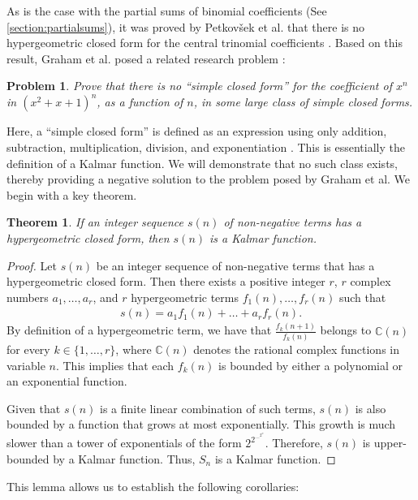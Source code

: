 \documentclass[10pt,a4paper]{article}
\theoremstyle{plain}
\newtheorem{theorem}{Theorem}[section]
\newtheorem{problem}{Problem}[section]
\begin{document}
As is the case with the partial sums of binomial coefficients (See \cref{section:partialsums}), it was proved by Petkovšek et al. that there is no hypergeometric closed form for the central trinomial coefficients \cite{petkovsek1996ab}. Based on this result, Graham et al. posed a related research problem \cite{graham1994concrete}:
\begin{problem} \label{problem:grahametal}
Prove that there is no ``simple closed form'' for the coefficient of $x^n$ in $(x^2+x+1)^n$, as a function of $n$, in some large class of simple closed forms.
\end{problem}
Here, a ``simple closed form'' is defined as an expression using only addition, subtraction, multiplication, division, and exponentiation \cite{graham1994concrete}. This is essentially the definition of a Kalmar function. We will demonstrate that no such class exists, thereby providing a negative solution to the problem posed by Graham et al. We begin with a key theorem.

\begin{theorem} \label{proof:hypergeokalmar}
If an integer sequence $s(n)$ of non-negative terms has a hypergeometric closed form, then $s(n)$ is a Kalmar function.
\end{theorem}
\begin{proof}
Let $s(n)$ be an integer sequence of non-negative terms that has a hypergeometric closed form. Then there exists a positive integer $r$, $r$ complex numbers $a_1, \ldots, a_r$, and $r$ hypergeometric terms $f_1(n), \ldots, f_r(n)$ such that
\begin{align*}
s(n) = a_1 f_1(n) + \ldots + a_r f_r(n) .
\end{align*}
By definition of a hypergeometric term, we have that $\frac{f_k(n+1)}{f_k(n)}$ belongs to $\mathbb{C}(n)$ for every $k \in \{1, \ldots, r\}$, where $\mathbb{C}(n)$ denotes the rational complex functions in variable $n$. This implies that each $f_k(n)$ is bounded by either a polynomial or an exponential function.

Given that $s(n)$ is a finite linear combination of such terms, $s(n)$ is also bounded by a function that grows at most exponentially. This growth is much slower than a tower of exponentials of the form $2^{2^{...^{2^n}}}$. Therefore, $s(n)$ is upper-bounded by a Kalmar function. Thus, $S_n$ is a Kalmar function.
\end{proof}

This lemma allows us to establish the following corollaries:
\end{document}
